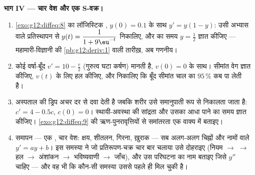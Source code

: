 \begin{problem}
\medskip
\noindent\textbf{भाग IV --- चार वेश और एक S-वक्र।}
\begin{enumerate}[resume]
  \item \cref{exo:g12:diffeq:8} का लॉजिस्टिक , $y(0) = 0.1$ के साथ $y' = y(1 - y)$: उसी अभ्यास वाले
        प्रतिस्थापन से $y(t) = \dfrac{1}{1 + 9\eu^{-t}}$ निकालिए, और  का समय $y = \frac12$
        ज्ञात कीजिए --- महामारी-विज्ञानी की \cref{pb:g12:deriv:1} वाली तारीख़, अब गणनीय।
  \item कोई वर्षा-बूँद $v' = 10 - \frac v2$ (गुरुत्व घटा कर्षण) मानती है, $v(0) = 0$ के साथ।
        सीमांत वेग ज्ञात कीजिए, $v(t)$ के लिए हल कीजिए, और निकालिए कि बूँद
        सीमांत चाल का $95\,\%$ कब पा लेती है।
  \item अस्पताल की ड्रिप अचर दर से दवा देती है जबकि शरीर उसे समानुपाती रूप
        से निकालता जाता है: $c' = 4 - 0.5c$, $c(0) = 0$। स्थायी-अवस्था की सांद्रता और उसका
        आधा पाने का समय ज्ञात कीजिए। \cref{exo:g12:diffeq:9} की ऋण-पुनरावृत्तियों से समांतरता
        एक वाक्य में बताइए।
  \item समापन --- एक , चार वेश: क्षय, शीतलन, गिरना, ख़ुराक --- सब
        अलग-अलग चिह्नों और नामों वाले $y' = ay + b$। इस समस्या ने जो प्रतिरूपण-चक्र
        चार बार चलाया उसे दोहराइए (नियम $\to$  $\to$ हल $\to$
        अंशांकन $\to$ भविष्यवाणी $\to$ जाँच), और उस परिघटना का नाम बताइए
        जिसे $y''$ चाहिए --- और वह भी कि कौन-सी समस्या उससे पहले ही मिल चुकी
        है।
\end{enumerate}
\end{problem}
